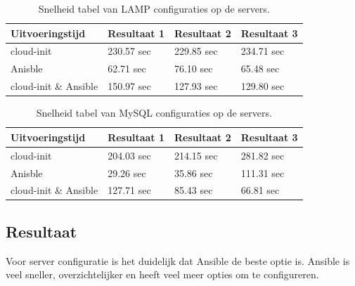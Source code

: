 \begin{table}[!htb]
    \centering
    \begin{tabular}{| l | l | l |l |}
        \hline
        \textbf{Uitvoeringstijd} & Resultaat 1 & Resultaat 2 & Resultaat 3   \\ \hline
        cloud-init & 230.57 sec & 229.85 sec & 234.71 sec  \\ \hline
        Anisble & 62.71 sec & 76.10 sec & 65.48 sec \\ \hline
        cloud-init \& Ansible & 150.97 sec & 127.93 sec & 129.80 sec \\
        \hline
    \end{tabular}
    \caption{Snelheid tabel van LAMP configuraties op de servers.}
    \label{tab:tabel lamp resultaten server}
\end{table}

\begin{table}[!htb]
    \centering
    \begin{tabular}{| l | l | l |l |}
        \hline
        \textbf{Uitvoeringstijd} & Resultaat 1 & Resultaat 2 & Resultaat 3   \\ \hline
        cloud-init & 204.03 sec & 214.15 sec & 281.82 sec  \\ \hline
        Anisble & 29.26 sec & 35.86 sec & 111.31 sec \\ \hline
        cloud-init \& Ansible & 127.71 sec & 85.43 sec & 66.81 sec \\
        \hline
    \end{tabular}
    \caption{Snelheid tabel van MySQL configuraties op de servers.}
    \label{tab:tabel mysql resultaten server}
\end{table}

\subsection{Resultaat}
Voor server configuratie is het duidelijk dat Ansible de beste optie is. Ansible is veel sneller, overzichtelijker en heeft veel meer opties om te configureren. 

